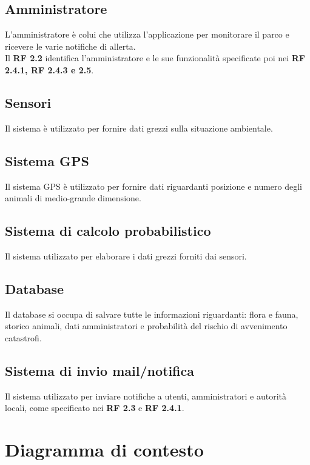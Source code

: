 \subsection{Amministratore}
L'amministratore è colui che utilizza l'applicazione per monitorare il parco e ricevere le varie notifiche di allerta. \\
Il \textbf{RF 2.2} identifica l'amministratore e le sue funzionalità specificate poi nei \textbf{RF 2.4.1, RF 2.4.3 e 2.5}.

\subsection{Sensori}
Il sistema è utilizzato per fornire dati grezzi sulla situazione ambientale. 

\subsection{Sistema GPS}
Il sistema GPS è utilizzato per fornire dati riguardanti posizione e numero degli animali di medio-grande dimensione.

\subsection{Sistema di calcolo probabilistico}
Il sistema utilizzato per elaborare i dati grezzi forniti dai sensori.

\subsection{Database}
Il database si occupa di salvare tutte le informazioni riguardanti: flora e fauna, storico animali, dati amministratori e probabilità del rischio di avvenimento catastrofi.

\subsection{Sistema di invio mail/notifica}
Il sistema utilizzato per inviare notifiche a utenti, amministratori e autorità locali, come specificato nei \textbf{RF 2.3} e \textbf{RF 2.4.1}.

\pagebreak
\section{Diagramma di contesto}

